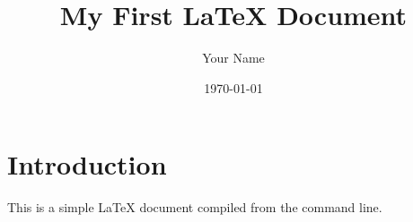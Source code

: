 \documentclass{article}
\begin{document}
\title{My First LaTeX Document}
\author{Your Name}
\date{\today}

\maketitle

\section{Introduction}
This is a simple LaTeX document compiled from the command line.
\end{document}
